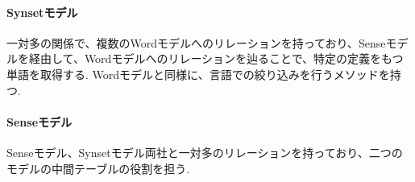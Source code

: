 \paragraph{Synsetモデル}
一対多の関係で、複数のWordモデルへのリレーションを持っており、Senseモデルを経由して、Wordモデルへのリレーションを辿ることで、特定の定義をもつ単語を取得する.
Wordモデルと同様に、言語での絞り込みを行うメソッドを持つ.

\paragraph{Senseモデル}
Senseモデル、Synsetモデル両社と一対多のリレーションを持っており、二つのモデルの中間テーブルの役割を担う.







